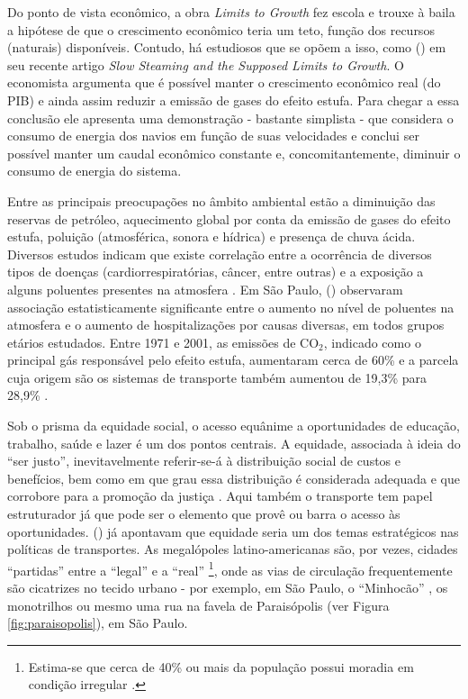 Do ponto de vista econômico, a obra \emph{Limits to Growth} fez escola e trouxe à baila a hipótese de que o crescimento econômico teria um teto, função dos recursos (naturais) disponíveis. Contudo, há estudiosos que se opõem a isso, como  (\citeyear{KRUGMAN2014}) em seu recente artigo \emph{Slow Steaming and the Supposed Limits to Growth}. O economista argumenta que é possível manter o crescimento econômico real (do PIB) e ainda assim reduzir a emissão de gases do efeito estufa. Para chegar a essa conclusão ele apresenta uma demonstração - bastante simplista - que considera o consumo de energia dos navios em função de suas velocidades e conclui ser possível manter um caudal econômico constante e, concomitantemente, diminuir o consumo de energia do sistema.

Entre as principais preocupações no âmbito ambiental estão a diminuição das reservas de petróleo, aquecimento global por conta da emissão de gases do efeito estufa, poluição (atmosférica, sonora e hídrica) e presença de chuva ácida. Diversos estudos indicam que existe correlação entre a ocorrência de diversos tipos de doenças (cardiorrespiratórias, câncer, entre outras) e a exposição a alguns poluentes presentes na atmosfera \cite{WHO2000,WHO2006,BRUNEKREEF2012,MIRANDA2012}. Em São Paulo,  (\citeyear{GOUVEIA2006}) observaram associação estatisticamente significante entre o aumento no nível de poluentes na atmosfera e o aumento de hospitalizações por causas diversas, em todos grupos etários estudados. Entre 1971 e 2001, as emissões de CO$_2$, indicado como o principal gás responsável pelo efeito estufa, aumentaram cerca de 60\% e a parcela cuja origem são os sistemas de transporte também aumentou de 19,3\% para 28,9\% \cite{BANISTER2005}.

Sob o prisma da equidade social, o acesso equânime a oportunidades de educação, trabalho, saúde e lazer é um dos pontos centrais. A equidade, associada à ideia do ``ser justo'', inevitavelmente referir-se-á à distribuição social de custos e benefícios, bem como em que grau essa distribuição é considerada adequada e que corrobore para a promoção da justiça \cite{LITMAN2006}. Aqui também o transporte tem papel estruturador já que pode ser o elemento que provê ou barra o acesso às oportunidades.  (\citeyear{SANCHEZ2003}) já apontavam que equidade seria um dos temas estratégicos nas políticas de transportes. As megalópoles latino-americanas são, por vezes, cidades ``partidas'' \cite{VENTURA2001} entre a ``legal'' e a ``real'' \cite{ALVA1997}%
\footnote{Estima-se que cerca de 40\% ou mais da população possui moradia em condição irregular \cite{FREITAG2007}.},
onde as vias de circulação frequentemente são cicatrizes no tecido urbano - por exemplo, em São Paulo, o ``Minhocão'' \cite{ABASCAL2010}, os monotrilhos \cite{ROLNIK2010} ou mesmo uma rua na favela de Paraisópolis (ver Figura \ref{fig:paraisopolis}), em São Paulo.


